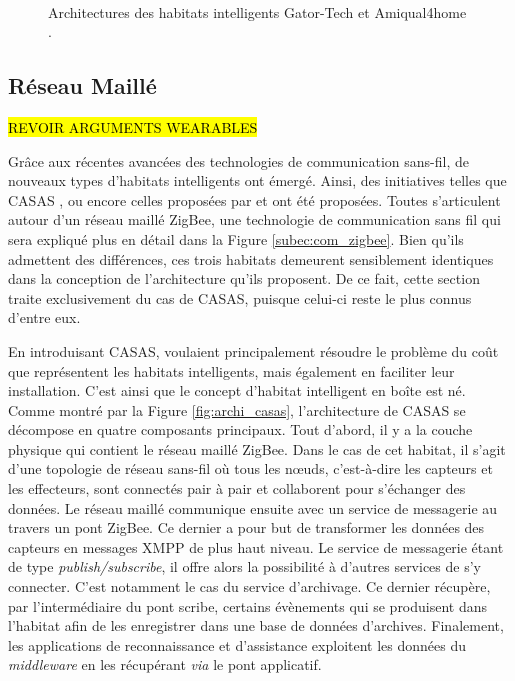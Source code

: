 \begin{figure}[H]
	\centering
	\\[20pt]
	\caption[Architectures des habitats intelligents Gator-Tech et Amiqual4home.]{Architectures des habitats intelligents Gator-Tech \citep{Helal2005} et Amiqual4home \citep{Lago2017}.}
\end{figure}

\subsection{Réseau Maillé}

\hl{REVOIR ARGUMENTS WEARABLES}

Grâce aux récentes avancées des technologies de communication sans-fil, de nouveaux types d'habitats intelligents ont émergé. Ainsi, des initiatives telles que CASAS \citep{Cook2013}, ou encore celles proposées par \cite{Zhihua2016} et \cite{Zhenyu2011} ont été proposées. Toutes s'articulent autour d'un réseau maillé ZigBee, une technologie de communication sans fil qui sera expliqué plus en détail dans la Figure \ref{subec:com_zigbee}. Bien qu'ils admettent des différences, ces trois habitats demeurent sensiblement identiques dans la conception de l'architecture qu'ils proposent. De ce fait, cette section traite exclusivement du cas de CASAS, puisque celui-ci reste le plus connus d'entre eux.

En introduisant CASAS, \cite{Cook2013} voulaient principalement résoudre le problème du coût que représentent les habitats intelligents, mais également en faciliter leur installation. C'est ainsi que le concept d'habitat intelligent en boîte est né. Comme montré par la Figure \ref{fig:archi_casas}, l'architecture de CASAS se décompose en quatre composants principaux. Tout d'abord, il y a la couche physique qui contient le réseau maillé ZigBee. Dans le cas de cet habitat, il s'agit d'une topologie de réseau sans-fil où tous les n\oe{}uds, c'est-à-dire les capteurs et les effecteurs, sont connectés pair à pair et collaborent pour s'échanger des données. Le réseau maillé communique ensuite avec un service de messagerie au travers un pont ZigBee. Ce dernier a pour but de transformer les données des capteurs en messages \ac{XMPP} de plus haut niveau. Le service de messagerie étant de type \textit{publish/subscribe}, il offre alors la possibilité à d'autres services de s'y connecter. C'est notamment le cas du service d'archivage. Ce dernier récupère, par l'intermédiaire du pont scribe, certains évènements qui se produisent dans l'habitat afin de les enregistrer dans une base de données d'archives. Finalement, les applications de reconnaissance et d'assistance exploitent les données du \textit{middleware} en les récupérant \textit{via} le pont applicatif.

